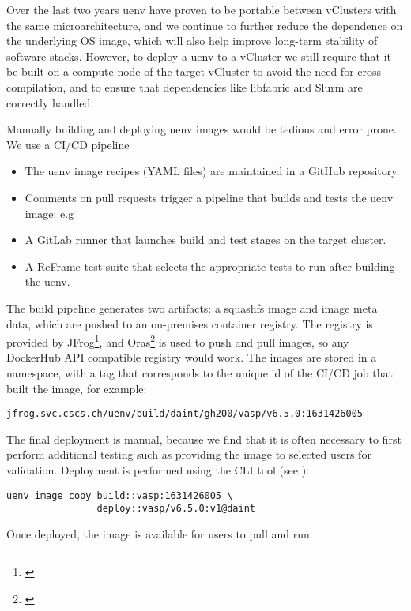 Over the last two years uenv have proven to be portable between vClusters with the same microarchitecture, and we continue to further reduce the dependence on the underlying OS image, which will also help improve long-term stability of software stacks.
However, to deploy a uenv to a vCluster we still require that it be built on a compute node of the target vCluster to avoid the need for cross compilation, and to ensure that dependencies like libfabric and Slurm are correctly handled.

Manually building and deploying uenv images would be tedious and error prone.
We use a CI/CD pipeline 
\begin{itemize}
    \item The uenv image recipes (YAML files) are maintained in a GitHub repository.
    \item Comments on pull requests trigger a pipeline that builds and tests the uenv image: e.g 
    \item A GitLab runner that launches build and test stages on the target cluster.
    \item A ReFrame test suite that selects the appropriate tests to run after building the uenv.
\end{itemize}

The build pipeline generates two artifacts: a squashfs image and image meta data, which are pushed to an on-premises container registry.
The registry is provided by JFrog\footnote{\href{https://jfrog.com}{}}, and Oras\footnote{\href{https://oras.land}{}} is used to push and pull images, so any DockerHub API compatible registry would work.
The images are stored in a  namespace, with a tag that corresponds to the unique id of the CI/CD job that built the image, for example:
\begin{lstlisting}
jfrog.svc.cscs.ch/uenv/build/daint/gh200/vasp/v6.5.0:1631426005
\end{lstlisting}

The final deployment is manual, because we find that it is often necessary to first perform additional testing such as providing the image to selected users for validation.
Deployment is performed using the CLI tool (see ):
\begin{lstlisting}
uenv image copy build::vasp:1631426005 \
                deploy::vasp/v6.5.0:v1@daint
\end{lstlisting}
Once deployed, the image is available for users to pull and run.

